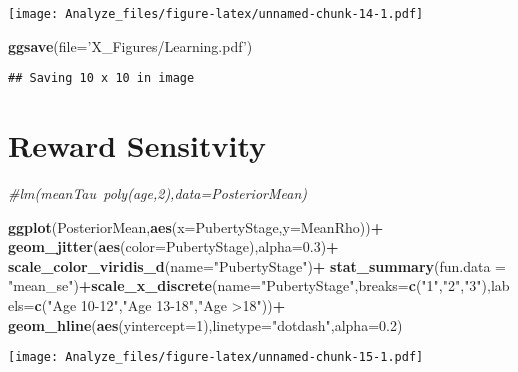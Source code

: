 \documentclass[]{article}
\newenvironment{Shaded}{\begin{snugshade}}{\end{snugshade}}
\newcommand{\KeywordTok}[1]{\textcolor[rgb]{0.13,0.29,0.53}{\textbf{#1}}}
\newcommand{\DataTypeTok}[1]{\textcolor[rgb]{0.13,0.29,0.53}{#1}}
\newcommand{\DecValTok}[1]{\textcolor[rgb]{0.00,0.00,0.81}{#1}}
\newcommand{\FloatTok}[1]{\textcolor[rgb]{0.00,0.00,0.81}{#1}}
\newcommand{\StringTok}[1]{\textcolor[rgb]{0.31,0.60,0.02}{#1}}
\newcommand{\CommentTok}[1]{\textcolor[rgb]{0.56,0.35,0.01}{\textit{#1}}}
\newcommand{\OperatorTok}[1]{\textcolor[rgb]{0.81,0.36,0.00}{\textbf{#1}}}
\newcommand{\NormalTok}[1]{#1}
\begin{document}
\texttt{[image: Analyze\_files/figure-latex/unnamed-chunk-14-1.pdf]}

\begin{Shaded}
\begin{Highlighting}[]
\KeywordTok{ggsave}\NormalTok{(}\DataTypeTok{file=}\StringTok{'X_Figures/Learning.pdf'}\NormalTok{)}
\end{Highlighting}
\end{Shaded}

\begin{verbatim}
## Saving 10 x 10 in image
\end{verbatim}

\section{Reward Sensitvity}\label{reward-sensitvity}

\begin{Shaded}
\begin{Highlighting}[]
\CommentTok{#lm(meanTau~poly(age,2),data=PosteriorMean)}

\KeywordTok{ggplot}\NormalTok{(PosteriorMean,}\KeywordTok{aes}\NormalTok{(}\DataTypeTok{x=}\NormalTok{PubertyStage,}\DataTypeTok{y=}\NormalTok{MeanRho))}\OperatorTok{+}
\StringTok{  }\KeywordTok{geom_jitter}\NormalTok{(}\KeywordTok{aes}\NormalTok{(}\DataTypeTok{color=}\NormalTok{PubertyStage),}\DataTypeTok{alpha=}\FloatTok{0.3}\NormalTok{)}\OperatorTok{+}
\StringTok{  }\KeywordTok{scale_color_viridis_d}\NormalTok{(}\DataTypeTok{name=}\StringTok{"PubertyStage"}\NormalTok{)}\OperatorTok{+}
\StringTok{  }\KeywordTok{stat_summary}\NormalTok{(}\DataTypeTok{fun.data =} \StringTok{"mean_se"}\NormalTok{)}\OperatorTok{+}\KeywordTok{scale_x_discrete}\NormalTok{(}\DataTypeTok{name=}\StringTok{"PubertyStage"}\NormalTok{,}\DataTypeTok{breaks=}\KeywordTok{c}\NormalTok{(}\StringTok{"1"}\NormalTok{,}\StringTok{"2"}\NormalTok{,}\StringTok{"3"}\NormalTok{),}\DataTypeTok{labels=}\KeywordTok{c}\NormalTok{(}\StringTok{"Age 10-12"}\NormalTok{,}\StringTok{"Age 13-18"}\NormalTok{,}\StringTok{"Age >18"}\NormalTok{))}\OperatorTok{+}
\StringTok{  }\KeywordTok{geom_hline}\NormalTok{(}\KeywordTok{aes}\NormalTok{(}\DataTypeTok{yintercept=}\DecValTok{1}\NormalTok{),}\DataTypeTok{linetype=}\StringTok{"dotdash"}\NormalTok{,}\DataTypeTok{alpha=}\FloatTok{0.2}\NormalTok{)}
\end{Highlighting}
\end{Shaded}

\texttt{[image: Analyze\_files/figure-latex/unnamed-chunk-15-1.pdf]}
\end{document}
